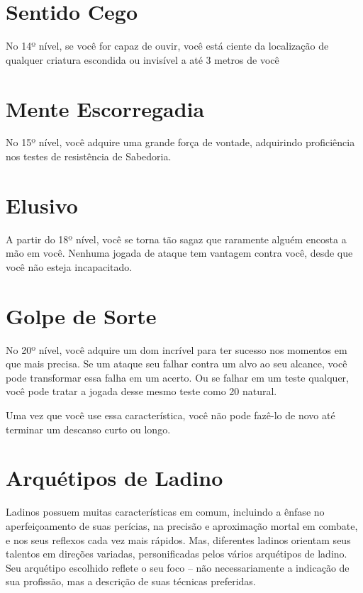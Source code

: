 \documentclass{RPG_Adventure}[2021/10/20]
\begin{document}
\begin{multicols}{2}
\section*{Sentido Cego}%

No 14º nível, se você for capaz de ouvir, você está ciente da localização de
qualquer criatura escondida ou invisível a até 3 metros de você

\section*{Mente Escorregadia}%

No 15º nível, você adquire uma grande força de vontade, adquirindo proficiência
nos testes de resistência de Sabedoria.

\section*{Elusivo}%

A partir do 18º nível, você se torna tão sagaz que raramente alguém encosta a
mão em você. Nenhuma jogada de ataque tem vantagem contra você, desde que você
não esteja incapacitado.

\section*{Golpe de Sorte}%

No 20º nível, você adquire um dom incrível para ter sucesso nos momentos em que
mais precisa. Se um ataque seu falhar contra um alvo ao seu alcance, você pode
transformar essa falha em um acerto. Ou se falhar em um teste qualquer, você
pode tratar a jogada desse mesmo teste como 20 natural.

Uma vez que você use essa característica, você não pode fazê-lo de novo até
terminar um descanso curto ou longo.

\section*{Arquétipos de Ladino}%

Ladinos possuem muitas características em comum, incluindo a ênfase no
aperfeiçoamento de suas perícias, na precisão e aproximação mortal em combate, e
nos seus reflexos cada vez mais rápidos. Mas, diferentes ladinos orientam seus
talentos em direções variadas, personificadas pelos vários arquétipos de ladino.
Seu arquétipo escolhido reflete o seu foco – não necessariamente a indicação de
sua profissão, mas a descrição de suas técnicas preferidas.


\end{multicols}
\end{document}
